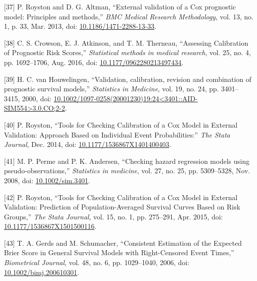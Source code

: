 \documentclass[12pt,PhD,twoside,openright]{muthesis}
\newenvironment{cslreferences}%
  {}%
  {\par}
\begin{document}
\begin{cslreferences}
\leavevmode\hypertarget{ref-royston_external_2013}{}%
{[}37{]} P. Royston and D. G. Altman, ``External validation of a Cox prognostic model: Principles and methods,'' \emph{BMC Medical Research Methodology}, vol. 13, no. 1, p. 33, Mar. 2013, doi: \href{https://doi.org/10.1186/1471-2288-13-33}{10.1186/1471-2288-13-33}.

\leavevmode\hypertarget{ref-crowson_assessing_2016}{}%
{[}38{]} C. S. Crowson, E. J. Atkinson, and T. M. Therneau, ``Assessing Calibration of Prognostic Risk Scores,'' \emph{Statistical methods in medical research}, vol. 25, no. 4, pp. 1692--1706, Aug. 2016, doi: \href{https://doi.org/10.1177/0962280213497434}{10.1177/0962280213497434}.

\leavevmode\hypertarget{ref-houwelingen_validation_2000}{}%
{[}39{]} H. C. van Houwelingen, ``Validation, calibration, revision and combination of prognostic survival models,'' \emph{Statistics in Medicine}, vol. 19, no. 24, pp. 3401--3415, 2000, doi: \href{https://doi.org/10.1002/1097-0258(20001230)19:24\%3C3401::AID-SIM554\%3E3.0.CO;2-2}{10.1002/1097-0258(20001230)19:24\textless3401::AID-SIM554\textgreater3.0.CO;2-2}.

\leavevmode\hypertarget{ref-royston_tools_2014}{}%
{[}40{]} P. Royston, ``Tools for Checking Calibration of a Cox Model in External Validation: Approach Based on Individual Event Probabilities:'' \emph{The Stata Journal}, Dec. 2014, doi: \href{https://doi.org/10.1177/1536867X1401400403}{10.1177/1536867X1401400403}.

\leavevmode\hypertarget{ref-perme_checking_2008}{}%
{[}41{]} M. P. Perme and P. K. Andersen, ``Checking hazard regression models using pseudo-observations,'' \emph{Statistics in medicine}, vol. 27, no. 25, pp. 5309--5328, Nov. 2008, doi: \href{https://doi.org/10.1002/sim.3401}{10.1002/sim.3401}.

\leavevmode\hypertarget{ref-royston_tools_2015}{}%
{[}42{]} P. Royston, ``Tools for Checking Calibration of a Cox Model in External Validation: Prediction of Population-Averaged Survival Curves Based on Risk Groups,'' \emph{The Stata Journal}, vol. 15, no. 1, pp. 275--291, Apr. 2015, doi: \href{https://doi.org/10.1177/1536867X1501500116}{10.1177/1536867X1501500116}.

\leavevmode\hypertarget{ref-gerds_consistent_2006}{}%
{[}43{]} T. A. Gerds and M. Schumacher, ``Consistent Estimation of the Expected Brier Score in General Survival Models with Right-Censored Event Times,'' \emph{Biometrical Journal}, vol. 48, no. 6, pp. 1029--1040, 2006, doi: \href{https://doi.org/10.1002/bimj.200610301}{10.1002/bimj.200610301}.


\end{cslreferences}
\end{document}
